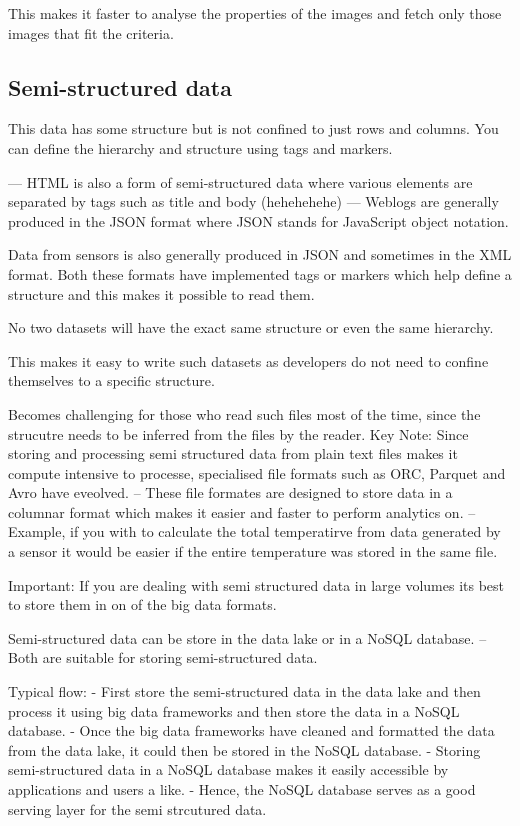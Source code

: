 \documentclass[a4paper, 11pt]{article}
\begin{document}
    This makes it faster to analyse the properties of the images and fetch only those images that fit the criteria.

    \subsection{Semi-structured data}
    This data has some structure but is not confined to just rows and columns.
    You can define the hierarchy and structure using tags and markers.

    --- HTML is also a form of semi-structured data where various elements are separated by tags such as title and body (hehehehehe)
    --- Weblogs are generally produced in the JSON format where JSON stands for JavaScript object notation.

    Data from sensors is also generally produced in JSON and sometimes in the XML format.
    Both these formats have implemented tags or markers which help define a structure and this makes it possible to read them.

    No two datasets will have the exact same structure or even the same hierarchy.

    This makes it easy to write such datasets as developers do not need to confine themselves to a specific structure.

    Becomes challenging for those who read such files most of the time, since the strucutre needs to be inferred from the files by the reader.
    Key Note: Since storing and processing semi structured data from plain text files makes it compute intensive to processe, specialised file formats such as ORC, Parquet and Avro have eveolved.
    -- These file formates are designed to store data in a columnar format which makes it easier and faster to perform analytics on.
    -- Example, if you with to calculate the total temperatirve from data generated by a sensor it would be easier if the entire temperature was stored in the same file.

    Important: If you are dealing with semi structured data in large volumes its best to store them in on of the big data formats.

    Semi-structured data can be store in the data lake or in a NoSQL database.
    -- Both are suitable for storing semi-structured data.

    Typical flow:
    - First store the semi-structured data in the data lake and then process it using big data frameworks and then store the data in a NoSQL database.
    - Once the big data frameworks have cleaned and formatted the data from the data lake, it could then be stored in the NoSQL database.
    - Storing semi-structured data in a NoSQL database makes it easily accessible by applications and users a like.
    - Hence, the NoSQL database serves as a good serving layer for the semi strcutured data.
\end{document}

